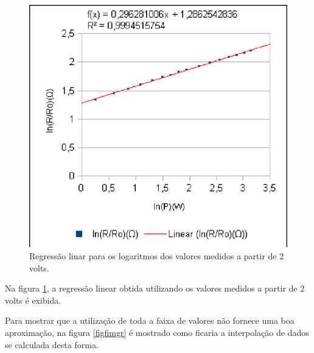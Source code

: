 \documentclass[brazilian,12pt,a4paper,final]{article}
\begin{document}
\begin{figure}[htbp!]
  \caption{Regressão linar para os logaritmos dos valores medidos a partir de 2 volts.}
  \label{figfimpeq}
  \centering
    \includegraphics{fimpeq.eps}
\end{figure}

Na figura \ref{figfimpeq}, a regressão linear obtida utilizando 
os valores medidos a partir de 2 volts é exibida.


Para mostrar que a utilização de toda a faixa de valores não fornece uma boa aproximação,
na figura \ref{figfimgr} é mostrado como ficaria a interpolação de dados se calculada desta forma.
\end{document}
